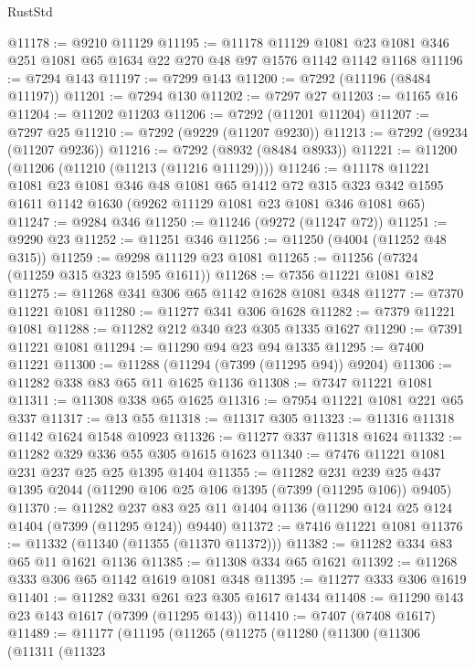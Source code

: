 \begin{lexlean}{RustStd}
\begin{coremodule}
@11178 := @9210 @11129
@11195 := @11178
    @11129
    @1081
    @23
    @1081
    @346
    @251
    @1081
    @65
    @1634
    @22
    @270
    @48
    @97
    @1576
    @1142
    @1142
    @1168
@11196 := @7294 @143
@11197 := @7299 @143
@11200 := @7292 (@11196 (@8484 @11197))
@11201 := @7294 @130
@11202 := @7297 @27
@11203 := @1165 @16
@11204 := @11202 @11203
@11206 := @7292 (@11201 @11204)
@11207 := @7297 @25
@11210 := @7292 (@9229 (@11207 @9230))
@11213 := @7292 (@9234 (@11207 @9236))
@11216 := @7292 (@8932 (@8484 @8933))
@11221 := @11200 (@11206 (@11210 (@11213 (@11216 @11129))))
@11246 := @11178
    @11221
    @1081
    @23
    @1081
    @346
    @48
    @1081
    @65
    @1412
    @72
    @315
    @323
    @342
    @1595
    @1611
    @1142
    @1630
    (@9262 @11129 @1081 @23 @1081 @346 @1081 @65)
@11247 := @9284 @346
@11250 := @11246 (@9272 (@11247 @72))
@11251 := @9290 @23
@11252 := @11251 @346
@11256 := @11250 (@4004 (@11252 @48 @315))
@11259 := @9298 @11129 @23 @1081
@11265 := @11256 (@7324 (@11259 @315 @323 @1595 @1611))
@11268 := @7356 @11221 @1081 @182
@11275 := @11268 @341 @306 @65 @1142 @1628 @1081 @348
@11277 := @7370 @11221 @1081
@11280 := @11277 @341 @306 @1628
@11282 := @7379 @11221 @1081
@11288 := @11282 @212 @340 @23 @305 @1335 @1627
@11290 := @7391 @11221 @1081
@11294 := @11290 @94 @23 @94 @1335
@11295 := @7400 @11221
@11300 := @11288 (@11294 (@7399 (@11295 @94)) @9204)
@11306 := @11282 @338 @83 @65 @11 @1625 @1136
@11308 := @7347 @11221 @1081
@11311 := @11308 @338 @65 @1625
@11316 := @7954 @11221 @1081 @221 @65 @337
@11317 := @13 @55
@11318 := @11317 @305
@11323 := @11316 @11318 @1142 @1624 @1548 @10923
@11326 := @11277 @337 @11318 @1624
@11332 := @11282 @329 @336 @55 @305 @1615 @1623
@11340 := @7476 @11221 @1081 @231 @237 @25 @25 @1395 @1404
@11355 := @11282
    @231
    @239
    @25
    @437
    @1395
    @2044
    (@11290 @106 @25 @106 @1395 (@7399 (@11295 @106)) @9405)
@11370 := @11282
    @237
    @83
    @25
    @11
    @1404
    @1136
    (@11290 @124 @25 @124 @1404 (@7399 (@11295 @124)) @9440)
@11372 := @7416 @11221 @1081
@11376 := @11332 (@11340 (@11355 (@11370 @11372)))
@11382 := @11282 @334 @83 @65 @11 @1621 @1136
@11385 := @11308 @334 @65 @1621
@11392 := @11268 @333 @306 @65 @1142 @1619 @1081 @348
@11395 := @11277 @333 @306 @1619
@11401 := @11282 @331 @261 @23 @305 @1617 @1434
@11408 := @11290 @143 @23 @143 @1617 (@7399 (@11295 @143))
@11410 := @7407 (@7408 @1617)
@11489 := @11177
    (@11195
      (@11265
        (@11275
          (@11280
            (@11300
              (@11306
                (@11311
                  (@11323

\end{coremodule}
\end{lexlean}
